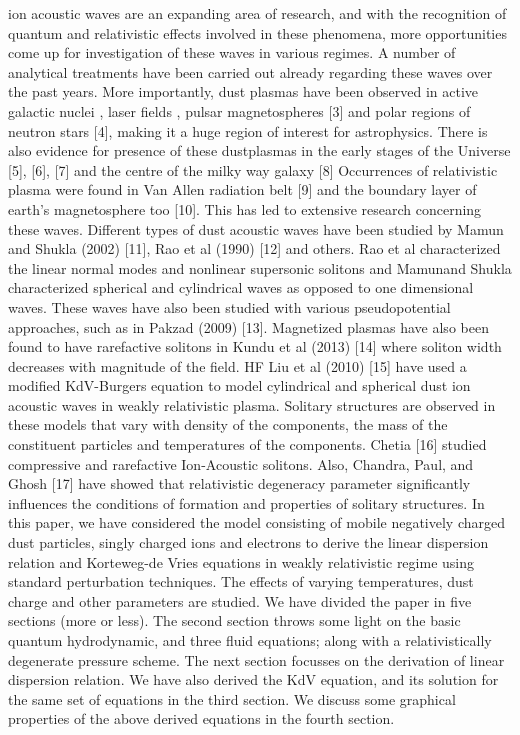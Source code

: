 \documentclass[journal]{IEEEtran}
\begin{document}
	 ion acoustic waves are an expanding area of research, and with the recognition of quantum and relativistic effects involved in these phenomena, more opportunities come up for investigation of these waves in various regimes. A number of analytical treatments have been carried out already regarding these waves over the past years. More importantly, dust plasmas have been observed in active galactic nuclei \cite{1}, laser fields \cite{2}, pulsar magnetospheres [3] and polar regions of neutron stars [4], making it a huge region of interest for astrophysics. There is also evidence for presence of these dustplasmas in the early stages of the Universe [5], [6], [7] and the centre of the milky way galaxy [8] Occurrences of relativistic plasma were found in Van Allen radiation belt [9] and the boundary layer of earth’s magnetosphere too [10]. This has led to extensive research concerning these waves. Diﬀerent types of dust acoustic waves have been studied by Mamun and Shukla (2002) [11], Rao et al (1990) [12] and others. Rao et al characterized the linear normal modes and nonlinear supersonic solitons and Mamunand Shukla characterized spherical and cylindrical waves as opposed to one dimensional waves. These waves have also been studied with various pseudopotential approaches, such as in Pakzad (2009) [13]. Magnetized plasmas have also been found to have rarefactive solitons in Kundu et al (2013) [14] where soliton width decreases with magnitude of the ﬁeld. HF Liu et al (2010) [15] have used a modiﬁed KdV-Burgers equation to model cylindrical and spherical dust ion acoustic waves in weakly relativistic plasma. Solitary structures are observed in these models that vary with density of the components, the mass of the constituent particles and temperatures of the components. Chetia [16] studied compressive and rarefactive Ion-Acoustic solitons. Also, Chandra, Paul, and Ghosh [17] have showed that relativistic degeneracy parameter signiﬁcantly inﬂuences the conditions of formation and properties of solitary structures. In this paper, we have considered the model consisting of mobile negatively charged dust particles, singly charged ions and electrons to derive the linear dispersion relation and Korteweg-de Vries equations in weakly relativistic regime using standard perturbation techniques. The effects of varying temperatures, dust charge and other parameters are studied. We have divided the paper in five sections (more or less). The second section throws some light on the basic quantum hydrodynamic, and three ﬂuid equations; along with a relativistically degenerate pressure scheme. The next section focusses on the derivation of linear dispersion relation. We have also derived the KdV equation, and its solution for the same set of equations in the third section. We discuss some graphical properties of the above derived equations in the fourth section.
\end{document}
